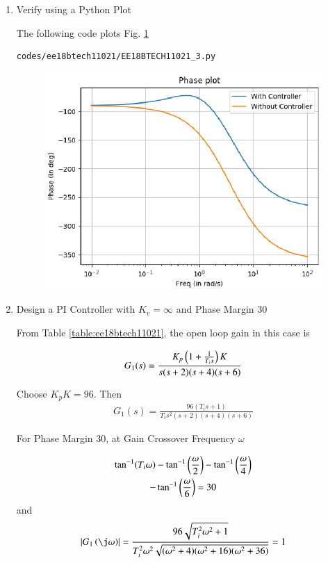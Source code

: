 \begin{enumerate}[label=\thesubsection.\arabic*.,ref=\thesubsection.\theenumi]
\item
Verify using a Python Plot

\solution The following code plots Fig. \ref{fig:ee18btech11021_pd}

\begin{lstlisting}
codes/ee18btech11021/EE18BTECH11021_3.py
\end{lstlisting}

\begin{figure}[!ht]
\centering
\includegraphics[width=\columnwidth]{./figs/ee18btech11021/EE18BTECH11021_PD.eps}
\caption{}
\label{fig:ee18btech11021_pd}
\end{figure}

\item
Design a PI Controller with $K_{v} = \infty$ and Phase Margin 30\degree

\solution From Table \ref{table:ee18btech11021}, the open loop gain in this case is

\begin{align}
    G_{1}(s) = \frac{K_{p}\left(1 +  \frac{1}{T_{i}s}\right)K}{s(s+2)(s+4)(s+6)}
\end{align}

Choose $K_{p}K = 96$. Then
\begin{align}
    G_{1}(s) = \frac{96(T_{i}s + 1)}{T_{i}s^2(s+2)(s+4)(s+6)}
\end{align}

For Phase Margin 30\degree, at Gain Crossover Frequency $\omega$

\begin{multline}
    \tan^{-1}(T_{i}\omega) - \tan^{-1}\left(\frac{\omega}{2}\right) - \tan^{-1}\left(\frac{\omega}{4}\right)
\\
-    \tan^{-1}\left(\frac{\omega}{6}\right) = 30
\end{multline}
and
\begin{align}
    \abs{G_{1}\brak{\j\omega}} = \frac{96\sqrt{T_{i}^2\omega^2 + 1}}{T_{i}^2\omega^2\sqrt{(\omega^2+4)(\omega^2 + 16)(\omega^2 + 36)}} = 1
\end{align}


\end{enumerate}
